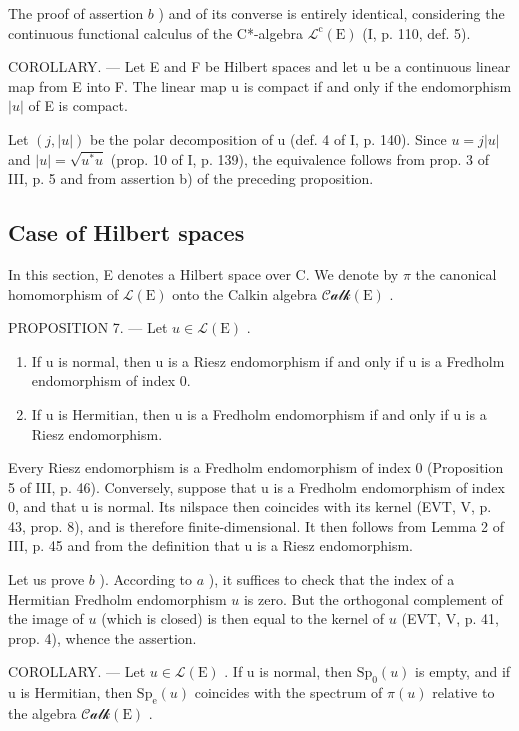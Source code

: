 The proof of assertion \(b\) ) and of its converse is entirely identical, considering the continuous functional calculus of the C*-algebra \(\mathcal{L}^{\mathrm{c}}(\mathrm{E})\) (I, p. 110, def. 5).

COROLLARY. --- Let E and F be Hilbert spaces and let u be a continuous linear map from E into F. The linear map u is compact if and only if the endomorphism \(|u|\) of E is compact.

Let \((j, |u|)\) be the polar decomposition of u (def. 4 of I, p. 140). Since \(u = j|u|\) and \(|u| = \sqrt{u^{*}u}\) (prop. 10 of I, p. 139), the equivalence follows from prop. 3 of III, p. 5 and from assertion b) of the preceding proposition.

\subsection{Case of Hilbert spaces}

In this section, E denotes a Hilbert space over C. We denote by \(\pi\) the canonical homomorphism of \(\mathcal{L}(\mathrm{E})\) onto the Calkin algebra \(\mathcal{Calk}(\mathrm{E})\) .

PROPOSITION 7. --- Let \(u \in \mathcal{L}(\mathrm{E})\) .

\begin{enumerate}
\def\labelenumi{\alph{enumi})}
\item
  If u is normal, then u is a Riesz endomorphism if and only if u is a Fredholm endomorphism of index 0.
\item
  If u is Hermitian, then u is a Fredholm endomorphism if and only if u is a Riesz endomorphism.
\end{enumerate}

Every Riesz endomorphism is a Fredholm endomorphism of index 0 (Proposition 5 of III, p. 46). Conversely, suppose that u is a Fredholm endomorphism of index 0, and that u is normal. Its nilspace then coincides with its kernel (EVT, V, p. 43, prop. 8), and is therefore finite-dimensional. It then follows from Lemma 2 of III, p. 45 and from the definition that u is a Riesz endomorphism.

Let us prove \(b\) ). According to \(a\) ), it suffices to check that the index of a Hermitian Fredholm endomorphism \(u\) is zero. But the orthogonal complement of the image of \(u\) (which is closed) is then equal to the kernel of \(u\) (EVT, V, p. 41, prop. 4), whence the assertion.

COROLLARY. --- Let \(u \in \mathcal{L}(\mathrm{E})\) . If u is normal, then \(\mathrm{Sp}_{0}(u)\) is empty, and if u is Hermitian, then \(\mathrm{Sp}_{\mathrm{e}}(u)\) coincides with the spectrum of \(\pi(u)\) relative to the algebra \(\mathcal{Calk}(\mathrm{E})\) .

